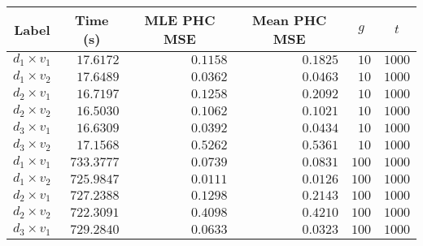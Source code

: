 \begin{tabular}{lrrrrr}
  \toprule
  \multicolumn{1}{c}{Label} & \multicolumn{1}{c}{Time (s)} & \multicolumn{1}{c}{MLE PHC MSE} & \multicolumn{1}{c}{Mean PHC MSE} & \multicolumn{1}{c}{$g$} & \multicolumn{1}{c}{$t$} \\
  \midrule
   $d_1 \times v_1$ &                    $17.6172$ &                        $0.1158$ &                         $0.1825$ &                    $10$ &                  $1000$ \\
   $d_1 \times v_2$ &                    $17.6489$ &                        $0.0362$ &                         $0.0463$ &                    $10$ &                  $1000$ \\
   $d_2 \times v_1$ &                    $16.7197$ &                        $0.1258$ &                         $0.2092$ &                    $10$ &                  $1000$ \\
   $d_2 \times v_2$ &                    $16.5030$ &                        $0.1062$ &                         $0.1021$ &                    $10$ &                  $1000$ \\
   $d_3 \times v_1$ &                    $16.6309$ &                        $0.0392$ &                         $0.0434$ &                    $10$ &                  $1000$ \\
   $d_3 \times v_2$ &                    $17.1568$ &                        $0.5262$ &                         $0.5361$ &                    $10$ &                  $1000$ \\
   \midrule
   $d_1 \times v_1$ &                   $733.3777$ &                        $0.0739$ &                         $0.0831$ &                   $100$ &                  $1000$ \\
   $d_1 \times v_2$ &                   $725.9847$ &                        $0.0111$ &                         $0.0126$ &                   $100$ &                  $1000$ \\
   $d_2 \times v_1$ &                   $727.2388$ &                        $0.1298$ &                         $0.2143$ &                   $100$ &                  $1000$ \\
   $d_2 \times v_2$ &                   $722.3091$ &                        $0.4098$ &                         $0.4210$ &                   $100$ &                  $1000$ \\
   $d_3 \times v_1$ &                   $729.2840$ &                        $0.0633$ &                         $0.0323$ &                   $100$ &                  $1000$ \\

\end{tabular}
